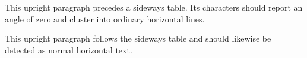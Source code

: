 \documentclass[12pt]{article}
\begin{document}
This upright paragraph precedes a sideways table. Its characters should
report an angle of zero and cluster into ordinary horizontal lines.

\vspace{1cm}
\begin{center}
\end{center}
\vspace{1cm}

This upright paragraph follows the sideways table and should likewise
be detected as normal horizontal text.
\end{document}
